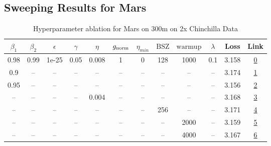 \subsection{Sweeping Results for Mars}%
\begin{table}[H]
\centering
\caption{Hyperparameter ablation for Mars on 300m on 2x Chinchilla Data}
\label{tab:ablation_mars_300m_on_2x_chinchilla_data}
\begin{tabular}{cccccccccccc}
\toprule
$\beta_1$ & $\beta_2$ & $\epsilon$ & $\gamma$ & $\eta$ & $g_{\mathrm{norm}}$ & $\eta_{min}$ & $\mathrm{BSZ}$ & $\mathrm{warmup}$ & $\lambda$ & Loss & Link \\
\midrule
0.98 & 0.99 & 1e-25 & 0.05 & 0.008 & 1 & 0 & 128 & 1000 & 0.1 & 3.158 & \href{https://wandb.ai/marin-community/optimizer-scaling/runs/sweep-300m-12B-marskbb066blr0.008-wd0.1-minlr0-warmup1000-b10.98-f75ea4}{0} \\
\midrule
0.9 & -- & -- & -- & -- & -- & -- & -- & -- & -- & 3.174 & \href{https://wandb.ai/marin-community/optimizer-scaling/runs/sweep-300m-12B-marsk83eefflr0.008-wd0.1-minlr0-warmup1000-b10.9--e2df5c}{1} \\
0.95 & -- & -- & -- & -- & -- & -- & -- & -- & -- & 3.156 & \href{https://wandb.ai/marin-community/optimizer-scaling/runs/sweep-300m-12B-marskb945b4lr0.008-wd0.1-minlr0-warmup1000-b10.95-2538fa}{2} \\
-- & -- & -- & -- & 0.004 & -- & -- & -- & -- & -- & 3.168 & \href{https://wandb.ai/marin-community/optimizer-scaling/runs/sweep-300m-12B-marsfd64d98lr0.004-wd0.1-minlr0-warmup1000-b10.98-e0cf98}{3} \\
-- & -- & -- & -- & -- & -- & -- & 256 & -- & -- & 3.171 & \href{https://wandb.ai/marin-community/optimizer-scaling/runs/sweep-300m-12B-marsk65640blr0.008-wd0.1-minlr0-warmup1000-b10.98-745d48}{4} \\
-- & -- & -- & -- & -- & -- & -- & -- & 2000 & -- & 3.159 & \href{https://wandb.ai/marin-community/optimizer-scaling/runs/sweep-300m-12B-marskf7adbelr0.008-wd0.1-minlr0-warmup2000-b10.98-b861e3}{5} \\
-- & -- & -- & -- & -- & -- & -- & -- & 4000 & -- & 3.167 & \href{https://wandb.ai/marin-community/optimizer-scaling/runs/sweep-300m-12B-marskcd8133lr0.008-wd0.1-minlr0-warmup4000-b10.98-8a3bc4}{6} \\
\bottomrule
\end{tabular}
\end{table}

